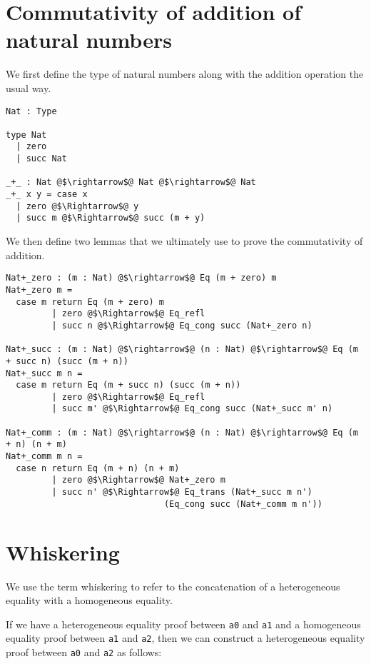 \documentclass[12pt,twoside,maitrise]{dms}
\theoremstyle{definition}
\numberwithin{equation}{section}
\numberwithin{table}{chapter}
\numberwithin{figure}{chapter}
\newcommand\id[1] {\texttt{#1}}
\begin{document}
\section{Commutativity of addition of natural numbers}

We first define the type of natural numbers along with the addition operation
the usual way.

\begin{verbatim}
Nat : Type

type Nat
  | zero
  | succ Nat

_+_ : Nat @$\rightarrow$@ Nat @$\rightarrow$@ Nat
_+_ x y = case x
  | zero @$\Rightarrow$@ y
  | succ m @$\Rightarrow$@ succ (m + y)
\end{verbatim}

We then define two lemmas that we ultimately use to prove the commutativity of
addition.

\begin{verbatim}
Nat+_zero : (m : Nat) @$\rightarrow$@ Eq (m + zero) m
Nat+_zero m =
  case m return Eq (m + zero) m
         | zero @$\Rightarrow$@ Eq_refl
         | succ n @$\Rightarrow$@ Eq_cong succ (Nat+_zero n)

Nat+_succ : (m : Nat) @$\rightarrow$@ (n : Nat) @$\rightarrow$@ Eq (m + succ n) (succ (m + n))
Nat+_succ m n =
  case m return Eq (m + succ n) (succ (m + n))
         | zero @$\Rightarrow$@ Eq_refl
         | succ m' @$\Rightarrow$@ Eq_cong succ (Nat+_succ m' n)

Nat+_comm : (m : Nat) @$\rightarrow$@ (n : Nat) @$\rightarrow$@ Eq (m + n) (n + m)
Nat+_comm m n =
  case n return Eq (m + n) (n + m)
         | zero @$\Rightarrow$@ Nat+_zero m
         | succ n' @$\Rightarrow$@ Eq_trans (Nat+_succ m n')
                               (Eq_cong succ (Nat+_comm m n'))
\end{verbatim}

\section{Whiskering}\label{app:whiskering}

We use the term whiskering to refer to the concatenation of a heterogeneous
equality with a homogeneous equality.

If we have a heterogeneous equality proof between \id{a0} and \id{a1} and a
homogeneous equality proof between \id{a1} and \id{a2}, then we can construct a
heterogeneous equality proof between \id{a0} and \id{a2} as follows:
\end{document}
